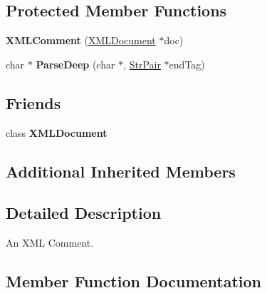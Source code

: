 \subsection*{Protected Member Functions}
\begin{DoxyCompactItemize}
\item 
{\bfseries X\+M\+L\+Comment} (\hyperlink{classtinyxml2_1_1_x_m_l_document}{X\+M\+L\+Document} $\ast$doc)\hypertarget{classtinyxml2_1_1_x_m_l_comment_ae6463adc3edd93a8e5a9b2b7e99cdf91}{}\label{classtinyxml2_1_1_x_m_l_comment_ae6463adc3edd93a8e5a9b2b7e99cdf91}

\item 
char $\ast$ {\bfseries Parse\+Deep} (char $\ast$, \hyperlink{classtinyxml2_1_1_str_pair}{Str\+Pair} $\ast$end\+Tag)\hypertarget{classtinyxml2_1_1_x_m_l_comment_aa6ab35c3bb1c1840371dc32a2040c57f}{}\label{classtinyxml2_1_1_x_m_l_comment_aa6ab35c3bb1c1840371dc32a2040c57f}

\end{DoxyCompactItemize}
\subsection*{Friends}
\begin{DoxyCompactItemize}
\item 
class {\bfseries X\+M\+L\+Document}\hypertarget{classtinyxml2_1_1_x_m_l_comment_a4eee3bda60c60a30e4e8cd4ea91c4c6e}{}\label{classtinyxml2_1_1_x_m_l_comment_a4eee3bda60c60a30e4e8cd4ea91c4c6e}

\end{DoxyCompactItemize}
\subsection*{Additional Inherited Members}


\subsection{Detailed Description}
An X\+ML Comment. 

\subsection{Member Function Documentation}
